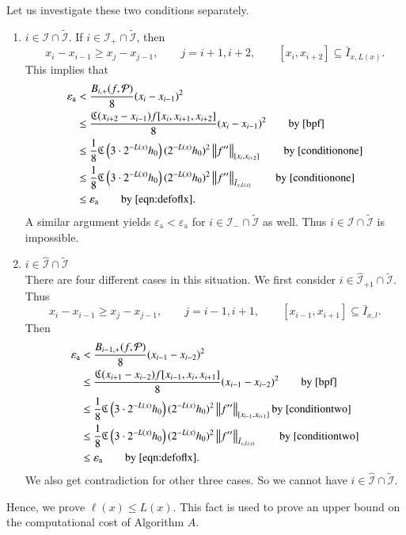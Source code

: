 \documentclass[review]{elsarticle}
\newcommand{\abstol}{\varepsilon_{\textrm{a}}}
\theoremstyle{definition}
\begin{document}
Let us investigate these two conditions separately.
\begin{enumerate}
  \item $i \in \mathcal{I} \cap \widetilde{\mathcal{I}}$.  If $i \in \mathcal{I}_+ \cap \widetilde{\mathcal{I}}$, then
  \begin{equation}
  \label{conditionone} x_{i}-x_{i-1} \ge x_{j}-x_{j-1}, \qquad   j=i+1,i+2, \qquad [x_i,x_{i+2}] \subseteq \bar{I}_{x,L(x)}.
  \end{equation}
  This implies that
  \begin{align*}
  \abstol & <  \frac{B_{i,+}(f,\cp)}{8}(x_i-x_{i-1})^2 \\
  & \le \frac{\fC(x_{i+2}-x_{i-1})f[x_{i},x_{i+1},x_{i+2}]}{8}(x_{i}-x_{i-1})^2 \qquad \text{by}~\eqref{bpf} \\
  &\le  \frac 1 8 \fC\left(3\cdot2^{-L(x)}h_0\right) (2^{-L(x)}h_0)^2\norm[{[x_{i},x_{i+2}]}]{f''} \qquad \text{by}~\eqref{conditionone} \\
     & \le   \frac 1 8 \fC\left(3\cdot2^{-L(x)}h_0\right) (2^{-L(x)}h_0)^2  \norm[\bar{I}_{x,L(x)}]{f''}  \qquad \text{by}~\eqref{conditionone} \\
     & \le    \abstol \qquad \text{by}~\eqref{eqn:defoflx} .
  \end{align*}
A similar argument yields $\abstol < \abstol$ for $i \in \mathcal{I}_- \cap \widetilde{\mathcal{I}}$ as well.  Thus $i \in \mathcal{I} \cap \widetilde{\mathcal{I}}$ is impossible.
  \item $i \in \widehat{\mathcal{I}}\cap \widetilde{\mathcal{I}}$\\
  There are four different cases in this situation. We first consider $i \in \widehat{\mathcal{I}}_{+1} \cap \widetilde{\mathcal{I}}$.
  Thus
  \begin{equation} \label{conditiontwo}
  x_{i}-x_{i-1} \ge x_{j}-x_{j-1},\qquad j=i-1,i+1, \qquad [x_{i-1},x_{i+1}] \subseteq \bar{I}_{x,l}.
  \end{equation}
  Then
  \begin{align*}
  \abstol & < \frac{B_{i-1,+}(f,\cp)}{8}(x_{i-1}-x_{i-2})^2 \\
& \le  \frac{\fC(x_{i+1}-x_{i-2})f[x_{i-1},x_{i},x_{i+1}]}{8}(x_{i-1}-x_{i-2})^2 \qquad  \text{by}~\eqref{bpf}   \\
 & \le  \frac 1 8 \fC\left(3\cdot2^{-L(x)}h_0\right) (2^{-L(x)}h_0)^2 \norm[{[x_{i-1},x_{i+1}]}]{f''}  \text{by}~\eqref{conditiontwo}  \\
     & \le   \frac 1 8 \fC\left(3\cdot2^{-L(x)}h_0\right) (2^{-L(x)}h_0)^2 \norm[\bar{I}_{x,L(x)}]{f''} \qquad \text{by}~\eqref{conditiontwo}  \\
     & \le  \abstol \qquad \text{by}~\eqref{eqn:defoflx}.
  \end{align*}
  We also get contradiction for other three cases. So we cannot have $i \in \widehat{\mathcal{I}}\cap \widetilde{\mathcal{I}}$.
\end{enumerate}
Hence, we prove $\ell(x) \le L(x)$. This fact is used to prove an upper bound on the computational cost of Algorithm $A$.
\end{document}
